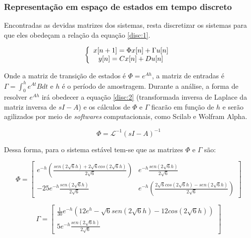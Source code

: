 \subsubsection{Representação em espaço de estados em tempo discreto}

Encontradas as devidas matrizes dos sistemas, resta discretizar os sistemas para que eles obedeçam a relação da equação \ref{disc:1}.

\begin{equation} \label{disc:1}
\centering
\left \{
\begin{array}{cc}
x[n+1] = \Phi x[n] + \Gamma u[n] \\
y[n] = C x[n] + D u[n]\\
\end{array}
\right.
\end{equation}

Onde a matriz de transição de estados é $\Phi = e^{Ah}$, a matriz de entradas é $\Gamma = \int_{0}^{h} e^{At} B dt$ e $h$ é o período de amostragem. Durante a análise, a forma de resolver $e^{Ah}$ irá obedecer a equação \ref{disc:2} (transformada inversa de Laplace da matriz inversa de $sI-A$) e os cálculos de $\Phi$ e $\Gamma$ ficarão em função de $h$ e serão agilizados por meio de \textit{softwares} computacionais, como Scilab e Wolfram Alpha.

\begin{equation} \label{disc:2}
    \Phi = \mathcal{L} ^{-1} (sI-A)^{-1}
\end{equation}

Dessa forma, para o sistema estável tem-se que as matrizes $\Phi$ e $\Gamma$ são:

\begin{equation} \label{est:6}
    \Phi= \begin{bmatrix} e^{-h} \left(\frac{sen(2\sqrt{6}h)+2\sqrt{6}cos(2\sqrt{6}h)}{2\sqrt{6}}\right) & e^{-h}\frac{sen(2\sqrt{6}h)}{2\sqrt{6}}\\ -25e^{-h}\frac{sen(2\sqrt{6}h)}{2\sqrt{6}} & e^{-h}\left(\frac{2\sqrt{6}cos(2\sqrt{6}h)-sen(2\sqrt{6}h)}{2\sqrt{6}}\right)\end{bmatrix}
\end{equation}

\begin{equation} \label{est:7}
    \Gamma = \begin{bmatrix} \frac{1}{30} e^{-h}(12e^{h}-\sqrt{6}sen(2\sqrt{6}h)-12cos(2\sqrt{6}h)) \\ 5e^{-h}\frac{sen(2\sqrt{6}h)}{2\sqrt{6}} \end{bmatrix}
\end{equation}

